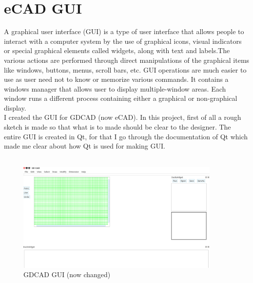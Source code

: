 \section{eCAD GUI}
A graphical user interface (GUI) is a type of user interface that allows people to interact with a computer system by the use of graphical icons, visual indicators or special graphical elements called widgets, along with text and labels.The various actions are performed through direct manipulations of the graphical items like windows, buttons, menus, scroll bars, etc. GUI operations are much easier to use as user need not to know or memorize various commands. It contains a windows manager that allows user to display multiple-window areas. Each window runs a different process containing either a graphical or non-graphical display.\\

I created the GUI for GDCAD (now eCAD). In this project, first of all a rough sketch is made so that what is to made should be clear to the designer. The entire GUI is created in Qt, for that I go through the documentation of Qt which made me clear about how Qt is used for making GUI.\\\\

\begin{figure}[!ht]
\centering
\includegraphics[width=0.9\textwidth]{images/gdcad.png}                   
\caption{GDCAD GUI (now changed)}
\end{figure}

